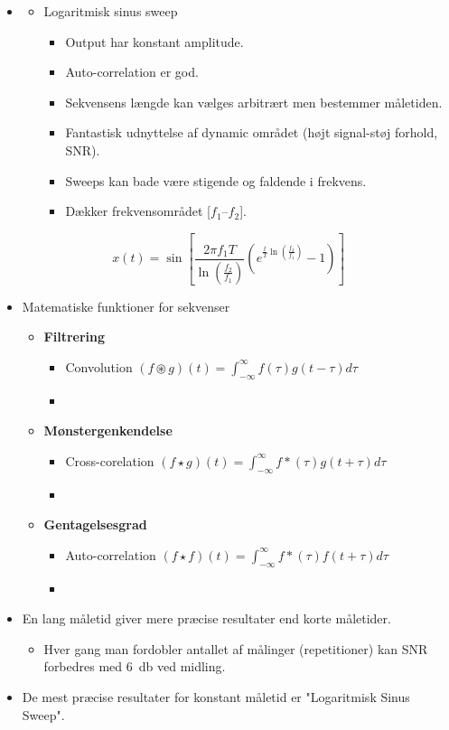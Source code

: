 \begin{itemize}
	\item[] 
	\begin{itemize}
		\item Logaritmisk sinus sweep
		\begin{itemize}
			\item Output har konstant amplitude.
			\item Auto-correlation er god.
			\item Sekvensens længde kan vælges arbitrært men bestemmer måletiden.
			\item Fantastisk udnyttelse af dynamic området (højt signal-støj forhold, SNR).
			\item Sweeps kan bade være stigende og faldende i frekvens.
			\item Dækker frekvensområdet [$f_1 – f_2$].
		\end{itemize}
	\end{itemize}
\end{itemize}

\begin{equation}
x(t)=\sin \left[\dfrac{2\pi f_1 T}{\ln
	\left(\frac{f_2}{f_1}\right)}\left(e^{\frac{t}{T}\ln
	\left(\frac{f_2}{f_1}\right)}-1\right)\right]
\end{equation}

\newpage
\begin{itemize}
	\item Matematiske funktioner for sekvenser
	\begin{itemize}
		\item \textbf{Filtrering}
		\begin{itemize}
			\item Convolution $(f\circledast g)(t) = \int_{-\infty}^{\infty}f(\tau)g(t-\tau)d\tau$ 
			\item[]
		\end{itemize}
		\item \textbf{Mønstergenkendelse}
		\begin{itemize}
			\item Cross-corelation $(f\star g)(t) =\int_{-\infty}^{\infty}f*(\tau)g(t+\tau)d\tau$
			\item[]
		\end{itemize}
		\item \textbf{Gentagelsesgrad}
		\begin{itemize}
		\item Auto-correlation $(f\star f)(t) =\int_{-\infty}^{\infty}f*(\tau)f(t+\tau)d\tau$
		\item[]
		\end{itemize}
	\end{itemize}
	\item En lang måletid giver mere præcise resultater end korte måletider.
	\begin{itemize}
		\item Hver gang man fordobler antallet af målinger (repetitioner) kan SNR forbedres med \SI{6}{\decibel} ved midling.
	\end{itemize}
	\item De mest præcise resultater for konstant måletid er "Logaritmisk Sinus
	Sweep".
\end{itemize}
